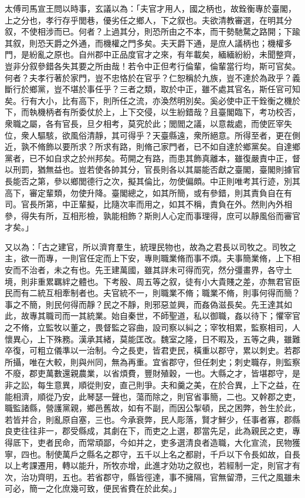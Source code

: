 \begin{pinyinscope}
 
 太傅司馬宣王問以時事，玄議以為：「夫官才用人，國之柄也，故銓衡專於臺閣，上之分也，孝行存乎閭巷，優劣任之鄉人，下之叙也。夫欲清教審選，在明其分叙，不使相涉而已。何者？上過其分，則恐所由之不本，而干勢馳騖之路開；下踰其叙，則恐天爵之外通，而機權之門多矣。夫天爵下通，是庶人議柄也；機權多門，是紛亂之原也。自州郡中正品度官才之來，有年載矣，緬緬紛紛，未聞整齊，豈非分叙參錯各失其要之所由哉！若令中正但考行倫輩，倫輩當行均，斯可官矣。何者？夫孝行著於家門，豈不忠恪於在官乎？仁恕稱於九族，豈不達於為政乎？義斷行於鄉黨，豈不堪於事任乎？三者之類，取於中正，雖不處其官名，斯任官可知矣。行有大小，比有高下，則所任之流，亦渙然明別矣。奚必使中正干銓衡之機於下，而執機柄者有所委仗於上，上下交侵，以生紛錯哉？且臺閣臨下，考功校否，衆職之屬，各有官長，旦夕相考，莫究於此；閭閻之議，以意裁處，而使匠宰失位，衆人驅駭，欲風俗清靜，其可得乎？天臺縣遠，衆所絕意。所得至者，更在側近，孰不脩飾以要所求？所求有路，則脩己家門者，已不如自達於鄉黨矣。自達鄉黨者，已不如自求之於州邦矣。苟開之有路，而患其飾真離本，雖復嚴責中正，督以刑罰，猶無益也。豈若使各帥其分，官長則各以其屬能否獻之臺閣，臺閣則據官長能否之第，參以鄉閭德行之次，擬其倫比，勿使偏頗。中正則唯考其行迹，別其高下，審定輩類，勿使升降。臺閣總之，如其所簡，或有參錯，則其責負自在有司。官長所第，中正輩擬，比隨次率而用之，如其不稱，責負在外。然則內外相參，得失有所，互相形檢，孰能相飾？斯則人心定而事理得，庶可以靜風俗而審官才矣。」
 
 
 
 
 又以為：「古之建官，所以濟育羣生，統理民物也，故為之君長以司牧之。司牧之主，欲一而專，一則官任定而上下安，專則職業脩而事不煩。夫事簡業脩，上下相安而不治者，未之有也。先王建萬國，雖其詳未可得而究，然分彊畫界，各守土境，則非重累羈絆之體也。下考殷、周五等之叙，徒有小大貴賤之差，亦無君官臣民而有二統互相牽制者也。夫官統不一，則職業不脩；職業不脩，則事何得而簡？事之不簡，則民何得而靜？民之不靜，則邪惡並興，而姦偽滋長矣。先王達其如此，故專其職司而一其統業。始自秦世，不師聖道，私以御職，姦以待下；懼宰官之不脩，立監牧以董之，畏督監之容曲，設司察以糾之；宰牧相累，監察相司，人懷異心，上下殊務。漢承其緒，莫能匡改。魏室之隆，日不暇及，五等之典，雖難卒復，可粗立儀準以一治制。今之長吏，皆君吏民，橫重以郡守，累以刺史。若郡所攝，唯在大較，則與州同，無為再重。宜省郡守，但任刺史；刺史職存，則監察不廢，郡吏萬數還親農業，以省煩費，豐財殖穀，一也。大縣之才，皆堪郡守，是非之訟，每生意異，順從則安，直己則爭。夫和羹之美，在於合異，上下之益，在能相濟，順從乃安，此琴瑟一聲也，蕩而除之，則官省事簡，二也。又幹郡之吏，職監諸縣，營護黨親，鄉邑舊故，如有不副，而因公掣頓，民之困弊，咎生於此，若皆并合，則亂原自塞，三也。今承衰弊，民人彫落，賢才鮮少，任事者寡，郡縣良吏往往非一，郡受縣成，其劇在下，而吏之上選，郡當先足，此為親民之吏，專得厎下，吏者民命，而常頑鄙，今如并之，吏多選清良者造職，大化宣流，民物獲寧，四也。制使萬戶之縣名之郡守，五千以上名之都尉，千戶以下令長如故，自長以上考課遷用，轉以能升，所牧亦增，此進才効功之叙也，若經制一定，則官才有次，治功齊明，五也。若省郡守，縣皆徑達，事不擁隔，官無留滯，三代之風雖未可必，簡一之化庶幾可致，便民省費在於此矣。」
 

\end{pinyinscope}
